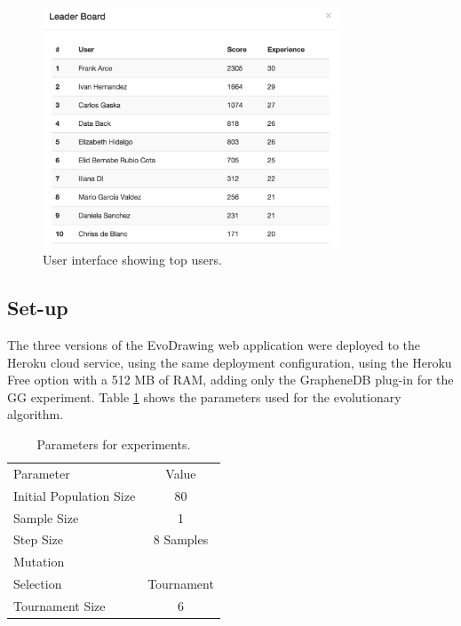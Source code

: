\documentclass[conference]{IEEEtran}
\begin{document}
\begin{figure}[!t]
    \centering
        \includegraphics[width=3.5in]{img/leaderBoard.png}
    \caption{User interface showing top users.}
    \label{fig:top-users}
\end{figure}



\subsection{Set-up}
\label{sec:setup}

The three versions of the EvoDrawing web application were deployed to the
Heroku cloud service, using the same deployment configuration, using the
Heroku Free option with a 512 MB of RAM, adding only the GrapheneDB plug-in for the GG experiment.
Table \ref{tab:params} shows the parameters used for the evolutionary algorithm.

\begin{table}
  \small
  \caption{ Parameters for experiments.  }
  \label{tab:params} 
  \centering
  \small
  \begin{tabular}{l  c   }
    \hline\noalign{\smallskip}
     Parameter & Value \\
    \noalign{\smallskip}\hline\noalign{\smallskip}
    Initial Population Size   & 80 \\ \hline
    Sample Size & 1 \\ \hline
    Step Size & 8 Samples \\ \hline
    Mutation &  \\ \hline
    Selection & Tournament \\ \hline
    Tournament Size &  6 \\ \hline
  \end{tabular}
\end{table}
\end{document}
